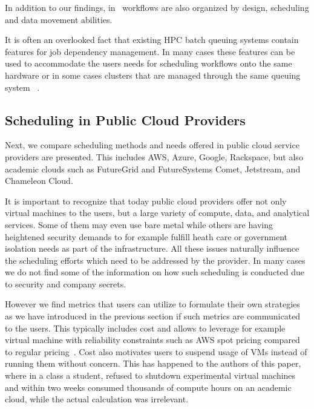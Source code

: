 \documentclass[final,5p,times,twocolumn]{elsarticle}
\begin{document}
In addition to our findings, in~\cite{yu2005taxonomy} workflows are
also organized by design, scheduling and data movement abilities.

It is often an overlooked fact that existing HPC batch queuing systems
contain features for job dependency management. In many cases these
features can be used to accommodate the users needs for scheduling
workflows onto the same hardware or in some cases clusters that are
managed through the same queuing
system
~\cite{www-lsf,www-moab,www-univa-GE-manual,www-pbs-manual}.







\subsection{Scheduling in Public Cloud Providers}
\label{sec:public}



Next, we compare scheduling methods and needs offered in public cloud
service providers are presented. This includes AWS, Azure, Google,
Rackspace, but also academic clouds such as FutureGrid and
FutureSystems Comet, Jetstream, and Chameleon Cloud.

It is important to recognize that today public cloud providers offer
not only virtual machines to the users, but a large variety of
compute, data, and analytical services. Some of them may even use bare
metal while others are having heightened security demands to for
example fulfill heath care or government isolation needs as part of
the infrastructure. All these issues naturally influence the
scheduling efforts which need to be addressed by the provider. In many
cases we do not find some of the information on how such scheduling is
conducted due to security and company secrets.

However we find metrics that users can utilize to formulate their own
strategies as we have introduced in the previous section if such
metrics are communicated to the users. This typically includes cost
and allows to leverage for example virtual machine with reliability
constraints such as AWS spot pricing compared to regular
pricing~\cite{AmazonEC22015}.  Cost also motivates users to suspend
usage of VMs instead of running them without concern. This has
happened to the authors of this paper, where in a class a student,
refused to shutdown experimental virtual machines and within two weeks
consumed thousands of compute hours on an academic cloud, while the
actual calculation was irrelevant.
\end{document}
